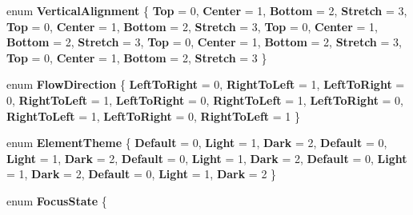 \begin{DoxyCompactItemize}
enum {\bfseries Vertical\+Alignment} \{ \newline
{\bfseries Top} = 0, 
{\bfseries Center} = 1, 
{\bfseries Bottom} = 2, 
{\bfseries Stretch} = 3, 
\newline
{\bfseries Top} = 0, 
{\bfseries Center} = 1, 
{\bfseries Bottom} = 2, 
{\bfseries Stretch} = 3, 
\newline
{\bfseries Top} = 0, 
{\bfseries Center} = 1, 
{\bfseries Bottom} = 2, 
{\bfseries Stretch} = 3, 
\newline
{\bfseries Top} = 0, 
{\bfseries Center} = 1, 
{\bfseries Bottom} = 2, 
{\bfseries Stretch} = 3, 
\newline
{\bfseries Top} = 0, 
{\bfseries Center} = 1, 
{\bfseries Bottom} = 2, 
{\bfseries Stretch} = 3
 \}
\item 
\mbox{\label{namespace_windows_1_1_u_i_1_1_xaml_a05520a61af727955c4e50fc1f58fb7db}} 
enum {\bfseries Flow\+Direction} \{ \newline
{\bfseries Left\+To\+Right} = 0, 
{\bfseries Right\+To\+Left} = 1, 
{\bfseries Left\+To\+Right} = 0, 
{\bfseries Right\+To\+Left} = 1, 
\newline
{\bfseries Left\+To\+Right} = 0, 
{\bfseries Right\+To\+Left} = 1, 
{\bfseries Left\+To\+Right} = 0, 
{\bfseries Right\+To\+Left} = 1, 
\newline
{\bfseries Left\+To\+Right} = 0, 
{\bfseries Right\+To\+Left} = 1
 \}
\item 
\mbox{\label{namespace_windows_1_1_u_i_1_1_xaml_a7e1a4f3aaa641c44365e5b007c4d84ce}} 
enum {\bfseries Element\+Theme} \{ \newline
{\bfseries Default} = 0, 
{\bfseries Light} = 1, 
{\bfseries Dark} = 2, 
{\bfseries Default} = 0, 
\newline
{\bfseries Light} = 1, 
{\bfseries Dark} = 2, 
{\bfseries Default} = 0, 
{\bfseries Light} = 1, 
\newline
{\bfseries Dark} = 2, 
{\bfseries Default} = 0, 
{\bfseries Light} = 1, 
{\bfseries Dark} = 2, 
\newline
{\bfseries Default} = 0, 
{\bfseries Light} = 1, 
{\bfseries Dark} = 2
 \}
\item 
\mbox{\label{namespace_windows_1_1_u_i_1_1_xaml_a1ea241d4a0cb7c10af82c7b36d2806bc}} 
enum {\bfseries Focus\+State} \{ \newline

\end{DoxyCompactItemize}
